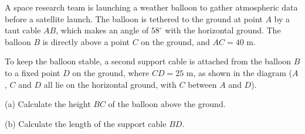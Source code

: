 \begin{question}
\noindent A space research team is launching a weather balloon to gather atmospheric data before a satellite launch. The balloon is tethered to the ground at point $A$ by a taut cable $AB$, which makes an angle of $58^{\circ}$ with the horizontal ground. The balloon $B$ is directly above a point $C$ on the ground, and $AC = 40$ m.

To keep the balloon stable, a second support cable is attached from the balloon $B$ to a fixed point $D$ on the ground, where $CD = 25$ m, as shown in the diagram ($A$, $C$ and $D$ all lie on the horizontal ground, with $C$ between $A$ and $D$).

\begin{center}
\end{center}

\noindent (a) Calculate the height $BC$ of the balloon above the ground.

\vspace{4cm}

\noindent (b) Calculate the length of the support cable $BD$.

\vspace{4cm}

\begin{flushright}
\end{flushright}
\end{question}
